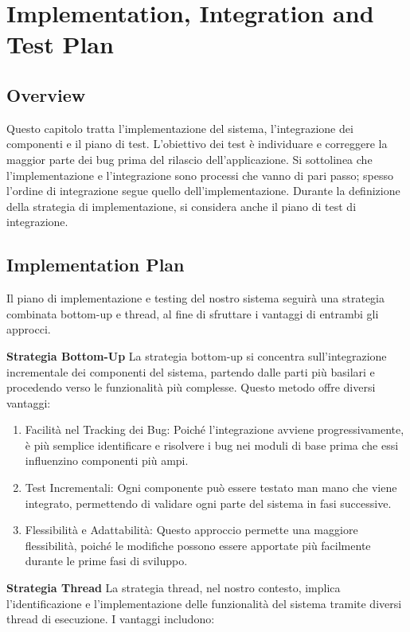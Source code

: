 \section{Implementation, Integration and Test Plan}
\subsection{Overview}
Questo capitolo tratta l'implementazione del sistema, l'integrazione dei componenti e il piano di test. L'obiettivo dei test è individuare e correggere la maggior parte dei bug prima del rilascio dell'applicazione. Si sottolinea che l'implementazione e l'integrazione sono processi che vanno di pari passo; spesso l'ordine di integrazione segue quello dell'implementazione. Durante la definizione della strategia di implementazione, si considera anche il piano di test di integrazione.

\subsection{Implementation Plan}
Il piano di implementazione e testing del nostro sistema seguirà una strategia combinata bottom-up e thread, al fine di sfruttare i vantaggi di entrambi gli approcci.


\noindent \textbf{Strategia Bottom-Up}
La strategia bottom-up si concentra sull'integrazione incrementale dei componenti del sistema, partendo dalle parti più basilari e procedendo verso le funzionalità più complesse. Questo metodo offre diversi vantaggi:

\begin{enumerate}
    \item Facilità nel Tracking dei Bug: Poiché l'integrazione avviene progressivamente, è più semplice identificare e risolvere i bug nei moduli di base prima che essi influenzino componenti più ampi.
    \item Test Incrementali: Ogni componente può essere testato man mano che viene integrato, permettendo di validare ogni parte del sistema in fasi successive.
    \item Flessibilità e Adattabilità: Questo approccio permette una maggiore flessibilità, poiché le modifiche possono essere apportate più facilmente durante le prime fasi di sviluppo.
\end{enumerate}

\noindent \textbf{Strategia Thread}
La strategia thread, nel nostro contesto, implica l'identificazione e l'implementazione delle funzionalità del sistema tramite diversi thread di esecuzione. I vantaggi includono:

